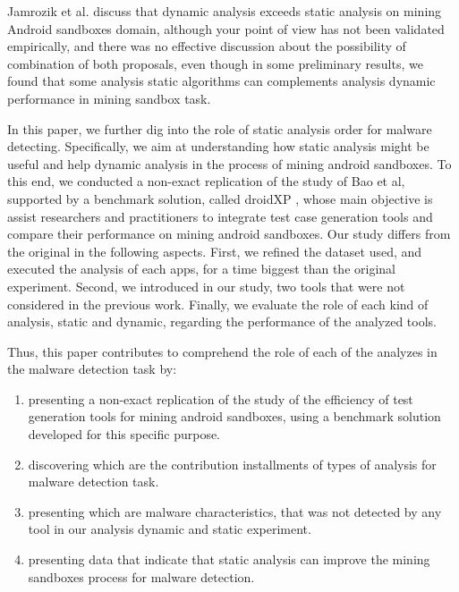 Jamrozik et al. \cite{jamrozik2016mining} discuss that dynamic analysis exceeds static analysis on mining Android sandboxes domain, although your point of view has not been validated empirically, and there was no effective discussion about the possibility of combination of both proposals, even though in some preliminary results, we found that some analysis static algorithms can complements analysis dynamic performance in mining sandbox task.

In this paper, we further dig into the role of static analysis order for malware detecting. Specifically, we aim at understanding how static analysis might be useful and help dynamic analysis in the process of mining android sandboxes. To this end, we conducted a non-exact replication of the study of Bao et al, supported by a benchmark solution, called droidXP \cite{dadroidxp}, whose main objective is  assist researchers and practitioners to integrate test case generation tools and compare their performance on mining android sandboxes. Our study differs from the original in the following aspects. First, we refined the dataset used, and executed the analysis of each apps, for a time biggest than the original experiment. Second, we introduced in our study, two tools that were not considered in the previous work. Finally, we evaluate the role of each kind of analysis, static and dynamic, regarding the performance of the analyzed tools.

Thus, this paper contributes to comprehend the role of each of the analyzes in the malware detection task by:

\begin{enumerate}[(1)]
 \item presenting a non-exact replication of the study of the efficiency of test generation tools for mining android sandboxes, using a benchmark solution developed for this specific purpose.
 
 \item discovering which are the contribution installments of types of analysis for malware detection task.
 
 \item presenting which are malware characteristics, that was not detected by any tool in our analysis dynamic and static experiment.
 
 \item presenting data that indicate that static analysis can improve the mining sandboxes process for malware detection.
 \end{enumerate}
 
